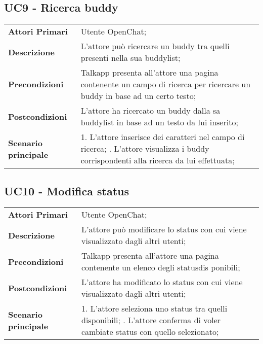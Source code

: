 \subsection{UC9 - Ricerca buddy}
	\begin{center}
	\bgroup
	\def\arraystretch{1.8}     
	\begin{longtable}{  p{4cm} | p{9.5cm} } 
		\textbf{Attori Primari} & Utente OpenChat; \\ 
		\textbf{Descrizione} &  L'attore può ricercare un  buddy tra quelli presenti nella sua buddylist; \\ 
		\textbf{Precondizioni}  & Talkapp presenta all'attore una pagina contenente un campo di ricerca per ricercare un buddy in base ad un certo testo; \\
		\textbf{Postcondizioni} & L'attore ha ricercato un buddy dalla sa buddylist in base ad un testo da lui inserito;  \\ 
		\textbf{Scenario principale} & 
		1. L'attore inserisce dei caratteri nel campo di ricerca; \newline
		2. L'attore visualizza i buddy corrispondenti alla ricerca da lui effettuata;
	\end{longtable}
	\egroup
\end{center}

\subsection{UC10 - Modifica status}
	\begin{center}
	\bgroup
	\def\arraystretch{1.8}     
	\begin{longtable}{  p{4cm} | p{9.5cm} } 
		\textbf{Attori Primari} & Utente OpenChat; \\ 
		\textbf{Descrizione} &  L'attore può modificare lo status con cui viene visualizzato dagli altri utenti; \\ 
		\textbf{Precondizioni}  & Talkapp presenta all'attore una pagina contenente un elenco degli statusdis ponibili; \\
		\textbf{Postcondizioni} & L'attore ha modificato lo status con cui viene visualizzato dagli altri utenti; \\ 
		\textbf{Scenario principale} & 
		1. L'attore seleziona uno status tra quelli disponibili; \newline
		2. L'attore conferma di voler cambiate status con quello selezionato;
	\end{longtable}
	\egroup
\end{center}

